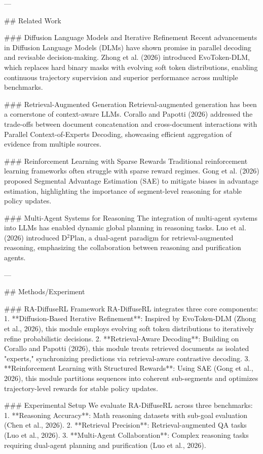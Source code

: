 ---

## Related Work

### Diffusion Language Models and Iterative Refinement
Recent advancements in Diffusion Language Models (DLMs) have shown promise in parallel decoding and revisable decision-making. Zhong et al. (2026) introduced EvoToken-DLM, which replaces hard binary masks with evolving soft token distributions, enabling continuous trajectory supervision and superior performance across multiple benchmarks.

### Retrieval-Augmented Generation
Retrieval-augmented generation has been a cornerstone of context-aware LLMs. Corallo and Papotti (2026) addressed the trade-offs between document concatenation and cross-document interactions with Parallel Context-of-Experts Decoding, showcasing efficient aggregation of evidence from multiple sources.

### Reinforcement Learning with Sparse Rewards
Traditional reinforcement learning frameworks often struggle with sparse reward regimes. Gong et al. (2026) proposed Segmental Advantage Estimation (SAE) to mitigate biases in advantage estimation, highlighting the importance of segment-level reasoning for stable policy updates.

### Multi-Agent Systems for Reasoning
The integration of multi-agent systems into LLMs has enabled dynamic global planning in reasoning tasks. Luo et al. (2026) introduced D$^2$Plan, a dual-agent paradigm for retrieval-augmented reasoning, emphasizing the collaboration between reasoning and purification agents.

---

## Methods/Experiment

### RA-DiffuseRL Framework
RA-DiffuseRL integrates three core components:
1. **Diffusion-Based Iterative Refinement**: Inspired by EvoToken-DLM (Zhong et al., 2026), this module employs evolving soft token distributions to iteratively refine probabilistic decisions.
2. **Retrieval-Aware Decoding**: Building on Corallo and Papotti (2026), this module treats retrieved documents as isolated "experts," synchronizing predictions via retrieval-aware contrastive decoding.
3. **Reinforcement Learning with Structured Rewards**: Using SAE (Gong et al., 2026), this module partitions sequences into coherent sub-segments and optimizes trajectory-level rewards for stable policy updates.

### Experimental Setup
We evaluate RA-DiffuseRL across three benchmarks:
1. **Reasoning Accuracy**: Math reasoning datasets with sub-goal evaluation (Chen et al., 2026).
2. **Retrieval Precision**: Retrieval-augmented QA tasks (Luo et al., 2026).
3. **Multi-Agent Collaboration**: Complex reasoning tasks requiring dual-agent planning and purification (Luo et al., 2026).

